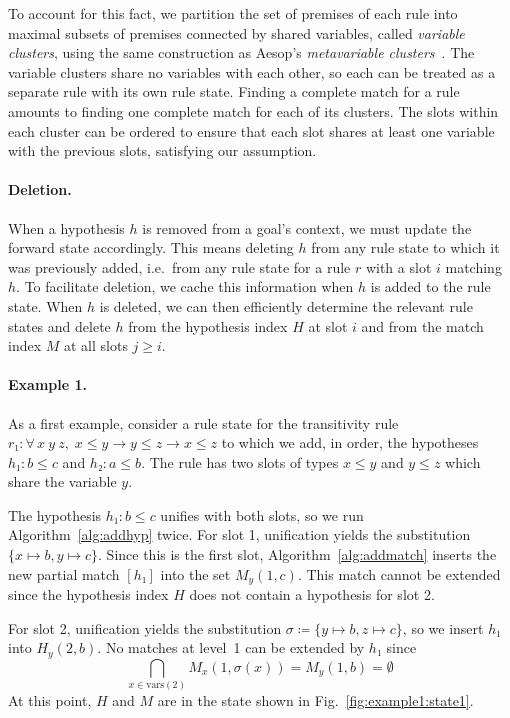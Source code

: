 \documentclass[runningheads]{llncs}
\newcommand{\All}[2]{\ensuremath{\forall\, #1,\; #2}}
\newcommand{\vars}{\ensuremath{\mathrm{vars}}}
\begin{document}
To account for this fact, we partition the set of premises of each rule into maximal subsets of premises connected by shared variables, called \emph{variable clusters}, using the same construction as Aesop's \emph{metavariable clusters}~\cite{Aesop}.
The variable clusters share no variables with each other, so each can be treated as a separate rule with its own rule state.
Finding a complete match for a rule amounts to finding one complete match for each of its clusters.
The slots within each cluster can be ordered to ensure that each slot shares at least one variable with the previous slots, satisfying our assumption.

\paragraph{Deletion.}
When a hypothesis $h$ is removed from a goal's context, we must update the forward state accordingly.
This means deleting $h$ from any rule state to which it was previously added, i.e.\ from any rule state for a rule $r$ with a slot $i$ matching $h$.
To facilitate deletion, we cache this information when $h$ is added to the rule state.
When $h$ is deleted, we can then efficiently determine the relevant rule states and delete $h$ from the hypothesis index $H$ at slot $i$ and from the match index $M$ at all slots $j ≥ i$.

\paragraph{Example 1.}
As a first example, consider a rule state for the transitivity rule $r₁ : \All{x~y~z}{x ≤ y → y ≤ z → x ≤ z}$ to which we add, in order, the hypotheses
$h₁ : b ≤ c$ and $h₂ : a ≤ b$.
The rule has two slots of types $x ≤ y$ and $y ≤ z$ which share the variable $y$.

The hypothesis $h₁ : b ≤ c$ unifies with both slots, so we run Algorithm~\ref{alg:addhyp} twice.
For slot 1, unification yields the substitution $\{x ↦ b, y ↦ c\}$.
Since this is the first slot, Algorithm~\ref{alg:addmatch} inserts the new partial match $[h₁]$ into the set $M_{y}(1, c)$.
This match cannot be extended since the hypothesis index $H$ does not contain a hypothesis for slot 2.

For slot 2, unification yields the substitution $σ ≔ \{y ↦ b, z ↦ c\}$, so we insert $h₁$ into $H_{y}(2, b)$.
No matches at level~1 can be extended by $h₁$ since
\[
  \bigcap_{x \in \vars(2)} M_{x}(1, σ(x)) = M_{y}(1, b) = \emptyset
\]
At this point, $H$ and $M$ are in the state shown in Fig.~\ref{fig:example1:state1}.
\end{document}
